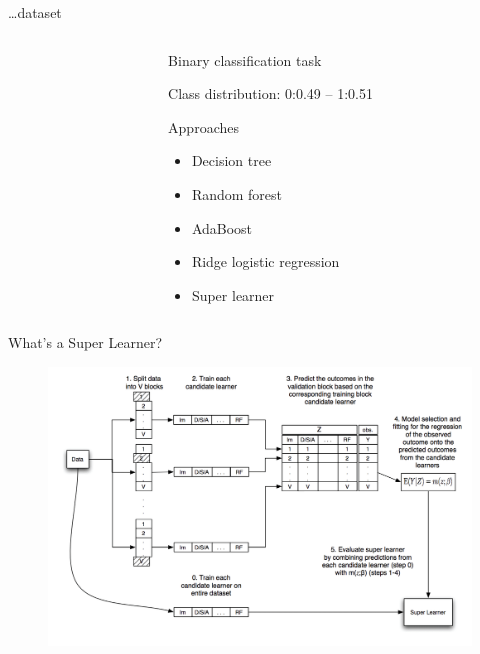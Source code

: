 

\begin{frame}{\dots dataset}

\begin{columns}[T]
\begin{column}{0.5\textwidth}

\end{column}
\begin{column}{0.5\textwidth}
Binary classification task%

Class distribution: 0:0.49 -- 1:0.51

Approaches
\begin{itemize}
	\item Decision tree
	\item Random forest
	\item AdaBoost
	\item Ridge logistic regression
	\item Super learner
\end{itemize}
\end{column}
\end{columns}

\end{frame}





\begin{frame}{What's a Super Learner?}

\begin{figure}
\includegraphics[width=\textwidth]{./Figures/sup-learn.jpg}
\end{figure}

\end{frame}

